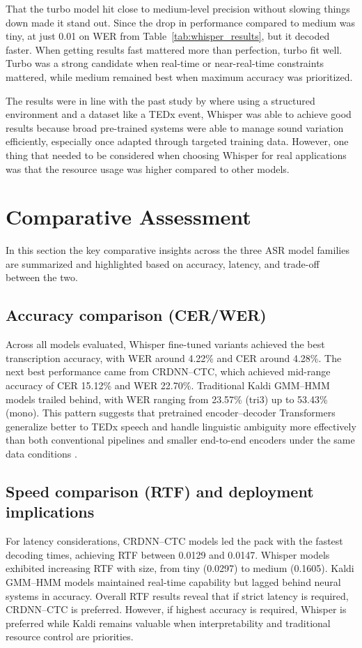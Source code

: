 That the turbo model hit close to medium-level precision without slowing things down made it stand out. Since the drop in performance compared to medium was tiny, at just 0.01 on WER from Table~\ref{tab:whisper_results}, but it decoded faster. When getting results fast mattered more than perfection, turbo fit well. Turbo was a strong candidate when real-time or near-real-time constraints mattered, while medium remained best when maximum accuracy was prioritized.

The results were in line with the past study by \textcite{radford2023robust} where using a structured environment and a dataset like a TEDx event, Whisper was able to achieve good results because broad pre-trained systems were able to manage sound variation efficiently, especially once adapted through targeted training data. However, one thing that needed to be considered when choosing Whisper for real applications was that the resource usage was higher compared to other models. 


\section{Comparative Assessment}
\label{sec:comparative_assessment}
In this section the key comparative insights across the three ASR model families are summarized and highlighted based on accuracy, latency, and trade-off between the two.

\subsection{Accuracy comparison (CER/WER)}
Across all models evaluated, Whisper fine-tuned variants achieved the best transcription accuracy, with WER around 4.22\% and CER around 4.28\%. The next best performance came from CRDNN--CTC, which achieved mid-range accuracy of CER 15.12\% and WER 22.70\%. Traditional Kaldi GMM--HMM models trailed behind, with WER ranging from 23.57\% (tri3) up to 53.43\% (mono). This pattern suggests that pretrained encoder--decoder Transformers generalize better to TEDx speech and handle linguistic ambiguity more effectively than both conventional pipelines and smaller end-to-end encoders under the same data conditions \parencite{radford2023robust, xu2023recent}.

\subsection{Speed comparison (RTF) and deployment implications}
For latency considerations, CRDNN--CTC models led the pack with the fastest decoding times, achieving RTF between 0.0129 and 0.0147. Whisper models exhibited increasing RTF with size, from tiny (0.0297) to medium (0.1605). Kaldi GMM--HMM models maintained real-time capability but lagged behind neural systems in accuracy. Overall RTF results reveal that if strict latency is required, CRDNN--CTC is preferred. However, if highest accuracy is required, Whisper is preferred while Kaldi remains valuable when interpretability and traditional resource control are priorities. 

